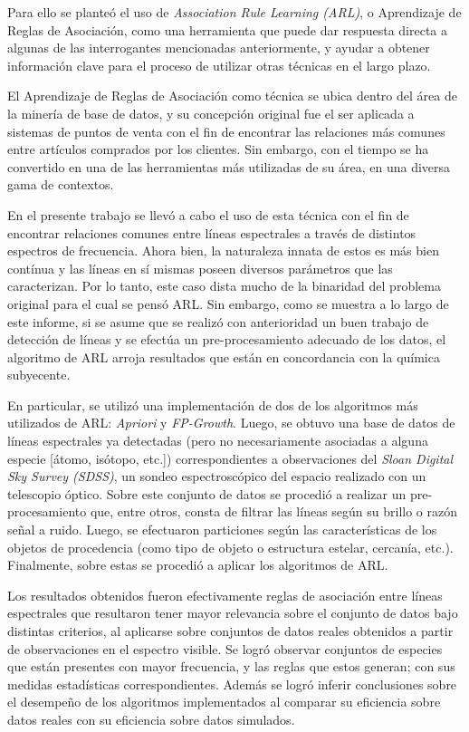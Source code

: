 \begin{intro}
Para ello se planteó el uso de \textit{Association Rule Learning (ARL)}, o Aprendizaje de Reglas de Asociación, como una herramienta que puede dar respuesta directa a algunas de las interrogantes mencionadas anteriormente, y ayudar a obtener información clave para el proceso de utilizar otras técnicas en el largo plazo.

El Aprendizaje de Reglas de Asociación como técnica se ubica dentro del área de la minería de base de datos, y su concepción original fue el ser aplicada a sistemas de puntos de venta con el fin de encontrar las relaciones más comunes entre artículos comprados por los clientes. Sin embargo, con el tiempo se ha convertido en una de las herramientas más utilizadas de su área, en una diversa gama de contextos.

En el presente trabajo se llevó a cabo el uso de esta técnica con el fin de encontrar relaciones comunes entre líneas espectrales a través de distintos espectros de frecuencia. Ahora bien, la naturaleza innata de estos es más bien contínua y las líneas en sí mismas poseen diversos parámetros que las caracterizan. Por lo tanto, este caso dista mucho de la binaridad del problema original para el cual se pensó ARL. Sin embargo, como se muestra a lo largo de este informe, si se asume que se realizó con anterioridad un buen trabajo de detección de líneas y se efectúa un pre-procesamiento adecuado de los datos, el algoritmo de ARL arroja resultados que están en concordancia con la química subyecente.

En particular, se utilizó una implementación de dos de los algoritmos más utilizados de ARL: \textit{Apriori} y \textit{FP-Growth}. Luego, se obtuvo una base de datos de líneas espectrales ya detectadas (pero no necesariamente asociadas a alguna especie [átomo, isótopo, etc.]) correspondientes a observaciones del \textit{Sloan Digital Sky Survey (SDSS)}, un sondeo espectroscópico del espacio realizado con un telescopio óptico. Sobre este conjunto de datos se procedió a realizar un pre-procesamiento que, entre otros, consta de filtrar las líneas según su brillo o razón señal a ruido. Luego, se efectuaron particiones según las características de los objetos de procedencia (como tipo de objeto o estructura estelar, cercanía, etc.). Finalmente, sobre estas se procedió a aplicar los algoritmos de ARL.

Los resultados obtenidos fueron efectivamente reglas de asociación entre líneas espectrales que resultaron tener mayor relevancia sobre el conjunto de datos bajo distintas criterios, al aplicarse sobre conjuntos de datos reales obtenidos a partir de observaciones en el espectro visible. Se logró observar conjuntos de especies que están presentes con mayor frecuencia, y las reglas que estos generan; con sus medidas estadísticas correspondientes. Además se logró inferir conclusiones sobre el desempeño de los algoritmos implementados al comparar su eficiencia sobre datos reales con su eficiencia sobre datos simulados.


\end{intro}
